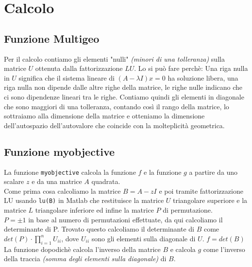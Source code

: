 \documentclass[12pt]{article}
\begin{document}
    \section{Calcolo}
    \subsection{Funzione Multigeo}
    Per il calcolo contiamo gli elementi "nulli" \textit{(minori di una tolleranza)} sulla matrice $U$ ottenuta dalla fattorizzazione $LU$. Lo si può fare perchè:
    Una riga nulla in $U$ significa che il sistema lineare di $(A-\lambda I)x = 0$ ha soluzione libera, una riga nulla non dipende dalle altre righe della matrice, le righe nulle indicano che ci sono dipendenze lineari tra le righe.
    Contiamo quindi gli elementi in diagonale che sono maggiori di una tolleranza, contando così il rango della matrice, lo sottraiamo alla dimensione della matrice e otteniamo la dimensione dell'autospazio dell'autovalore che coincide con la molteplicità geometrica.
    \subsection{Funzione myobjective}
    La funzione \texttt{myobjective} calcola la funzione $f$ e la funzione $g$ a partire da uno scalare $z$ e da una matrice $A$ quadrata.\\
    Come prima cosa calcoliamo la matrice $B = A - zI$ e poi tramite fattorizzazione LU usando \texttt{lu(B)} in Matlab che restituisce la matrice $U$ triangolare superiore e la matrice $L$ triangolare inferiore ed infine la matrice $P$ di permutazione. \\
    $P=\pm1$ in base al numero di permutazioni effettuate, da qui calcoliamo il determinante di P. Trovato questo calcoliamo il determinante di $B$ come $det(P) \cdot \prod_{i=1}^{n} U_{ii}$, dove $U_{ii}$ sono gli elementi sulla diagonale di $U$. $f = det(B)$\\
    La funzione dopodichè calcola l'inverso della matrice $B$  e calcola $g$ come l'inverso della traccia \textit{(somma degli elementi sulla diagonale)} di $B$.
    \newpage
\end{document}
